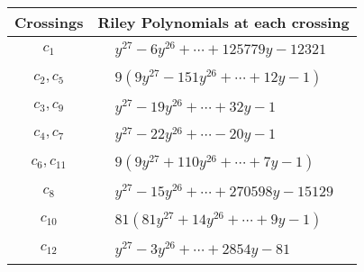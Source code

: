 \documentclass[1p]{elsarticle_modified}
\theoremstyle{definition}
\begin{document}
\begin{tabular}{m{50pt}|m{274pt}}
Crossings & \hspace{64pt}Riley Polynomials at each crossing \\
\hline $$\begin{aligned}c_{1}\end{aligned}$$&$\begin{aligned}
&y^{27}-6 y^{26}+\cdots+125779 y-12321
\end{aligned}$\\
\hline $$\begin{aligned}c_{2},c_{5}\end{aligned}$$&$\begin{aligned}
&9(9 y^{27}-151 y^{26}+\cdots+12 y-1)
\end{aligned}$\\
\hline $$\begin{aligned}c_{3},c_{9}\end{aligned}$$&$\begin{aligned}
&y^{27}-19 y^{26}+\cdots+32 y-1
\end{aligned}$\\
\hline $$\begin{aligned}c_{4},c_{7}\end{aligned}$$&$\begin{aligned}
&y^{27}-22 y^{26}+\cdots-20 y-1
\end{aligned}$\\
\hline $$\begin{aligned}c_{6},c_{11}\end{aligned}$$&$\begin{aligned}
&9(9 y^{27}+110 y^{26}+\cdots+7 y-1)
\end{aligned}$\\
\hline $$\begin{aligned}c_{8}\end{aligned}$$&$\begin{aligned}
&y^{27}-15 y^{26}+\cdots+270598 y-15129
\end{aligned}$\\
\hline $$\begin{aligned}c_{10}\end{aligned}$$&$\begin{aligned}
&81(81 y^{27}+14 y^{26}+\cdots+9 y-1)
\end{aligned}$\\
\hline $$\begin{aligned}c_{12}\end{aligned}$$&$\begin{aligned}
&y^{27}-3 y^{26}+\cdots+2854 y-81
\end{aligned}$\\
\hline
\end{tabular}\\~\\
\end{document}
